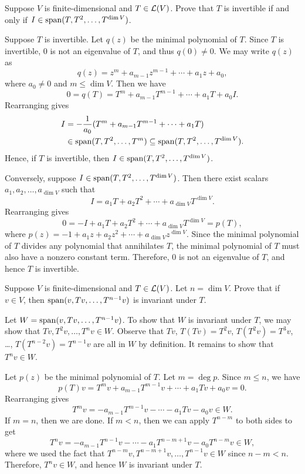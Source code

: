 \begin{exc}
\begin{exercise}
Suppose $V$ is finite-dimensional and $T\in\mathcal{L}(V)$. Prove that $T$ is
invertible if and only if $I\in\operatorname{span}(T,T^2,\dots,T^{\operatorname{dim} V})$.
\end{exercise}
\begin{solution}
Suppose $T$ is invertible. Let $q(z)$ be the minimal polynomial of $T$. Since
$T$ is invertible, $0$ is not an eigenvalue of $T$, and thus $q(0)\ne0$. We
may write $q(z)$ as
\[ q(z)=z^m+a_{m-1}z^{m-1}+\cdots+a_1z+a_0, \]
where $a_0\ne0$ and $m\le\dim V$. Then we have
\[ 0=q(T)=T^m+a_{m-1}T^{m-1}+\cdots+a_1T+a_0I. \]
Rearranging gives
\begin{align*}
I &= -\frac{1}{a_0}(T^m+a_{m-1}T^{m-1}+\cdots+a_1T)\\
  &\in \operatorname{span}(T,T^2,\dots,T^m)\subseteq\operatorname{span}(T,T^2,\dots,T^{\operatorname{dim} V}).
\end{align*}
Hence, if $T$ is invertible, then $I\in\operatorname{span}(T,T^2,\dots,T^{\operatorname{dim} V})$.

Conversely, suppose $I\in\operatorname{span}(T,T^2,\dots,T^{\operatorname{dim} V})$. Then there exist
scalars $a_1,a_2,\allowbreak\dots,a_{\dim V}$ such that
\[ I=a_1T+a_2T^2+\cdots+a_{\dim V}T^{\dim V}. \]
Rearranging gives
\[ 0=-I+a_1T+a_2T^2+\cdots+a_{\dim V}T^{\dim V}=p(T), \]
where $p(z)=-1+a_1z+a_2z^2+\cdots+a_{\dim V}z^{\dim V}$. Since the minimal
polynomial of $T$ divides any polynomial that annihilates $T$, the minimal
polynomial of $T$ must also have a nonzero constant term. Therefore, $0$ is
not an eigenvalue of $T$, and hence $T$ is invertible.
\end{solution}

\begin{exercise}
Suppose $V$ is finite-dimensional and $T\in\mathcal{L}(V)$. Let $n=\dim V$. Prove
that if $v\in V$, then $\operatorname{span}(v,Tv,\dots,T^{n-1}v)$ is invariant under $T$.
\end{exercise}
\begin{solution}
Let $W=\operatorname{span}(v,Tv,\dots,T^{n-1}v)$. To show that $W$ is invariant under $T$, we
may show that $Tv,T^2v,\dots,T^nv\in W$. Observe that $Tv$, $T(Tv)=T^2v$,
$T(T^2v)=T^3v$, \dots, $T(T^{n-2}v)=T^{n-1}v$ are all in $W$ by definition. It
remains to show that $T^nv\in W$.

Let $p(z)$ be the minimal polynomial of $T$. Let $m=\deg p$. Since $m\le n$,
we have
\[ p(T)v=T^mv+a_{m-1}T^{m-1}v+\cdots+a_1Tv+a_0v=0. \]
Rearranging gives
\[ T^mv=-a_{m-1}T^{m-1}v-\cdots-a_1Tv-a_0v\in W. \]
If $m=n$, then we are done. If $m<n$, then we can apply $T^{n-m}$ to both
sides to get
\[ T^nv=-a_{m-1}T^{n-1}v-\cdots-a_1T^{n-m+1}v-a_0T^{n-m}v\in W, \]
where we used the fact that $T^{n-m}v,T^{n-m+1}v,\dots,T^{n-1}v\in W$ since
$n-m<n$. Therefore, $T^nv\in W$, and hence $W$ is invariant under $T$.
\end{solution}


\end{exc}
